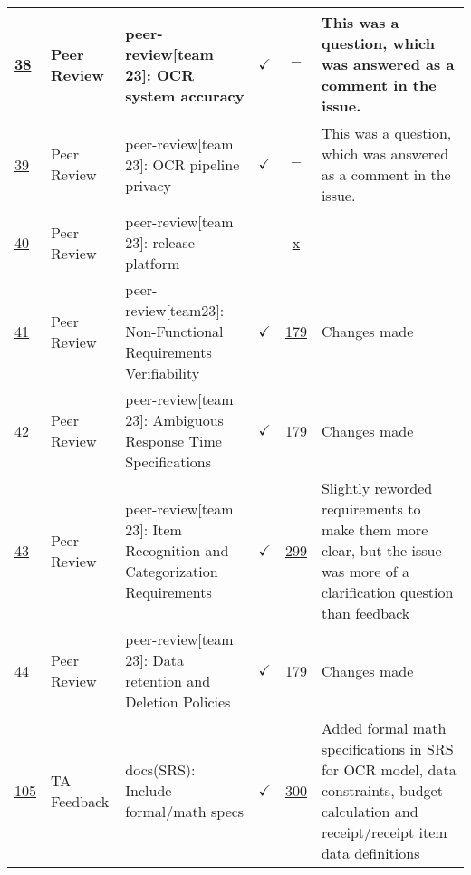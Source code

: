 \documentclass{article}
\begin{document}
\begin{table}[H]
{\begin{tabular}{p{1.5cm} p{2cm} p{3.5cm} c c p{4cm}}
        \href{https://github.com/PlutosCapstone/Plutos/issues/38}{38} & Peer
        Review & peer-review[team 23]: OCR system accuracy & $\checkmark$ & $-$
        & This was a question, which was answered as a comment in the issue.  \\ \hline
        \href{https://github.com/PlutosCapstone/Plutos/issues/39}{39} & Peer
        Review & peer-review[team 23]: OCR pipeline privacy & $\checkmark$ & $-$ &
        This was a question, which was answered as a comment in the issue.  \\ \hline
        \href{https://github.com/PlutosCapstone/Plutos/issues/40}{40} & Peer
        Review & peer-review[team 23]: release platform &
        & \href{https://github.com/PlutosCapstone/Plutos/pull/x}{x} &   \\ \hline
        \href{https://github.com/PlutosCapstone/Plutos/issues/41}{41} & Peer
        Review & peer-review[team23]: Non-Functional Requirements Verifiability
        & $\checkmark$ & \href{https://github.com/PlutosCapstone/Plutos/pull/179}{179} &
        Changes made  \\ \hline
        \href{https://github.com/PlutosCapstone/Plutos/issues/42}{42} & Peer
        Review & peer-review[team 23]: Ambiguous Response Time Specifications  &
        $\checkmark$ &
        \href{https://github.com/PlutosCapstone/Plutos/pull/179}{179} & Changes
        made  \\ \hline
        \href{https://github.com/PlutosCapstone/Plutos/issues/43}{43} & Peer
        Review & peer-review[team 23]: Item Recognition and Categorization
        Requirements  & $\checkmark$ &
        \href{https://github.com/PlutosCapstone/Plutos/pull/299}{299} & Slightly
        reworded requirements to make them more clear, but the issue was more of
        a clarification question than feedback \\ \hline
        \href{https://github.com/PlutosCapstone/Plutos/issues/44}{44} & Peer
        Review & peer-review[team 23]: Data retention and Deletion Policies  & $\checkmark$ &
        \href{https://github.com/PlutosCapstone/Plutos/pull/179}{179} & Changes
        made \\ \hline
        \href{https://github.com/PlutosCapstone/Plutos/issues/105}{105} & TA
        Feedback & docs(SRS): Include formal/math specs & $\checkmark$ & \href{https://github.com/PlutosCapstone/Plutos/pull/300}{300}
        &  Added formal math specifications in SRS for OCR model, data constraints, budget calculation and receipt/receipt item data definitions \\
    \bottomrule
    \end{tabular}%
    }
\end{table}
\end{document}
